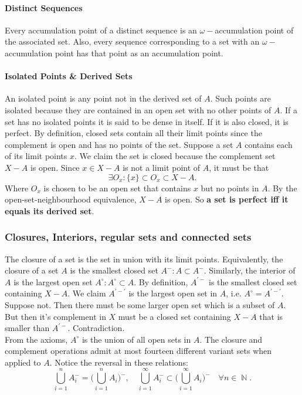 \documentclass{article}
\DeclareMathOperator\N{\mathbb{N}}
\begin{document}
\paragraph{Distinct Sequences}
Every accumulation point of a distinct sequence is an $\omega-$accumulation point of the associated set. Also, every sequence corresponding to a set with an $\omega-$accumulation point has that point
as an accumulation point.

\paragraph{Isolated Points \& Derived Sets}
An isolated point is any point not in the derived set of $A$. Such points are
isolated because they are contained in an open set with no other points of $A$. If a set
has no isolated points it is said to be dense in itself. If it is also closed, it is perfect. By definition, closed
sets contain all their limit points since the complement is open and has no points of the set.
Suppose a set $A$ contains each of its limit points $x$.
We claim the set is closed because the complement set $X-A$ is open.
Since $x \in X-A$ is not a limit point of $A$, it must be that
$$
\exists O_x: \{x\} \subset O_x \subset X-A.
$$
Where $O_x$ is chosen to be an open set that contains $x$ but no points in $A$. By the
open-set-neighbourhood equivalence, $X-A$ is open. So \textbf{a set is perfect iff it equals its derived set}.
\subsubsection{Closures, Interiors, regular sets and connected sets}
The closure of a set is the set in union with its limit points. Equivalently,
the closure of a set $A$ is the smallest closed set $A^-:A \subset A^-$. Similarly,
the interior of $A$ is the largest open set $A^\circ:A^\circ \subset A$. By definition, $A^{'-}$ is the smallest
closed set containing $X-A$. We claim $ A^{'-'}$ is the largest open set in $A$, i.e. $A^\circ = A^{'-'}$.
Suppose not. Then there must be some larger open set which is a subset of $A$. But then it's complement in $X$ must be a closed set
containing $X-A$ that is smaller than $A^{'-}$. Contradiction. \\ \newline From the axioms, $A^\circ$ is the union of all open sets in $A$. The closure and complement
operations admit at most fourteen different variant sets when applied to $A$.
\newpage{}
Notice the reversal in these relations:
$$
\bigcup_{i=1}^n A_i^- = \big( \bigcup_{i=1}^n A_i \big)^-, \quad \bigcup_{i=1}^\infty A_i^- \subset \big( \bigcup_{i=1}^\infty A_i \big)^- \quad \forall n \in \N.
$$
\end{document}
